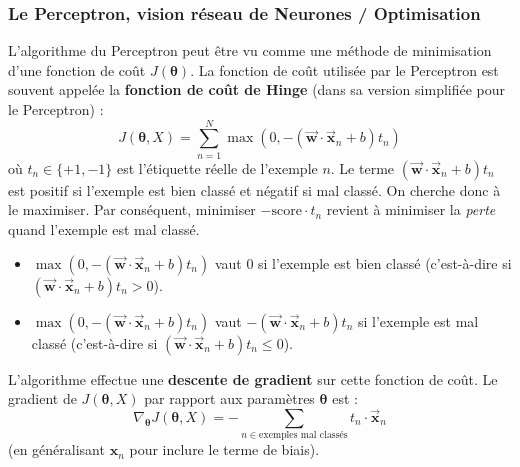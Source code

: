 \documentclass{article}
\begin{document}
\subsubsection{Le Perceptron, vision réseau de Neurones / Optimisation}
L'algorithme du Perceptron peut être vu comme une méthode de minimisation d'une fonction de coût $J(\mathbf{\theta})$.
La fonction de coût utilisée par le Perceptron est souvent appelée la \textbf{fonction de coût de Hinge} (dans sa version simplifiée pour le Perceptron) :
$$J(\mathbf{\theta}, X) = \sum_{n=1}^N \max(0, -(\mathbf{\vec{w}} \cdot \mathbf{\vec{x}}_n + b) t_n)$$
où $t_n \in \{+1, -1\}$ est l'étiquette réelle de l'exemple $n$. Le terme $(\mathbf{\vec{w}} \cdot \mathbf{\vec{x}}_n + b) t_n$ est positif si l'exemple est bien classé et négatif si mal classé. On cherche donc à le maximiser. Par conséquent, minimiser $-\text{score} \cdot t_n$ revient à minimiser la \textit{perte} quand l'exemple est mal classé.
\begin{itemize}
    \item $\max(0, -(\mathbf{\vec{w}} \cdot \mathbf{\vec{x}}_n + b) t_n)$ vaut $0$ si l'exemple est bien classé (c'est-à-dire si $(\mathbf{\vec{w}} \cdot \mathbf{\vec{x}}_n + b) t_n > 0$).
    \item $\max(0, -(\mathbf{\vec{w}} \cdot \mathbf{\vec{x}}_n + b) t_n)$ vaut $-(\mathbf{\vec{w}} \cdot \mathbf{\vec{x}}_n + b) t_n$ si l'exemple est mal classé (c'est-à-dire si $(\mathbf{\vec{w}} \cdot \mathbf{\vec{x}}_n + b) t_n \le 0$).
\end{itemize}
L'algorithme effectue une \textbf{descente de gradient} sur cette fonction de coût. Le gradient de $J(\mathbf{\theta}, X)$ par rapport aux paramètres $\mathbf{\theta}$ est :
$$\nabla_\mathbf{\theta} J(\mathbf{\theta}, X) = -\sum_{n \in \text{exemples mal classés}} t_n \cdot \mathbf{\vec{x}}_n$$
(en généralisant $\mathbf{x}_n$ pour inclure le terme de biais).
\end{document}
